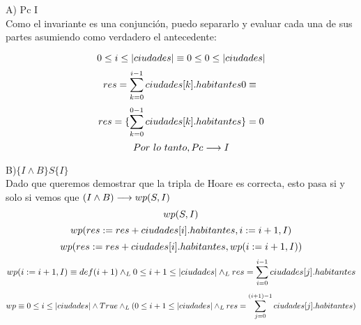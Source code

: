 \documentclass[10pt,a4paper]{article}
\begin{document}
\vspace{0.5cm}

A) Pc \implica I \vspace{0.2cm}\\
Como el invariante es una conjunción, puedo separarlo y evaluar cada una de sus partes asumiendo como verdadero el antecedente:

\[
0 \leq i \leq |ciudades| \equiv 0 \leq 0 \leq |ciudades| 
\vspace{0.2cm}
\]
\[
res =\sum\limits_{k=0}^{i-1}ciudades[k].habitantes 0 \equiv
 \vspace{0.2cm}\\
\]
\[
res = \{\sum\limits_{k=0}^{0-1}ciudades[k].habitantes\} = 0 
\vspace{0.5cm}\\
\]
\[
Por \ lo \ tanto, Pc \implica I 
\vspace{0.5cm}\\
\]

B)$\{I \land B \} S \{I\}$ \vspace{0.2cm}\\

Dado que queremos demostrar que la tripla de Hoare es correcta, esto pasa si y solo si vemos que $(I \land B) \longrightarrow wp(S,I)$\\
\[wp(S,I)\\\]
\[wp(res := res + ciudades[i].habitantes, i := i+1, I)\\\]
\[wp(res := res + ciudades[i].habitantes, wp(i := i+1, I))\\ \\\]
\[wp (i := i+1, I) \equiv def(i+1) \land _L 0 \leq i+1 \leq |ciudades| \land _L res = \sum\limits_{i=0}^{i-1}ciudades[j].habitantes\\\]
\[wp \equiv 0 \leq i \leq |ciudades| \land True \land _L (0 \leq i+1 \leq |ciudades| \land _L res = \sum\limits_{j=0}^{(i+1)-1}ciudades[j].habitantes)\\ \]
\end{document}

